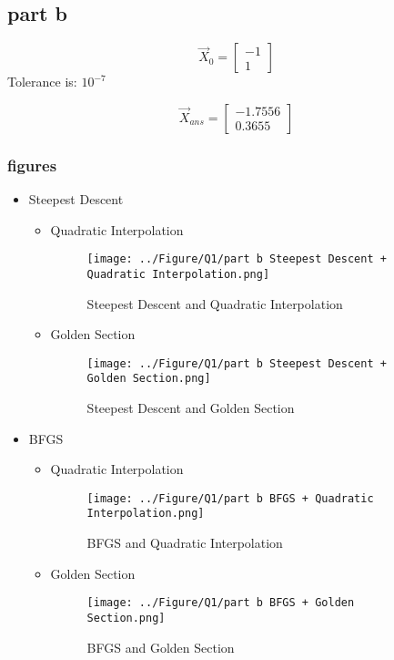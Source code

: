 \subsection{part b}
$$\vec X_0 = \begin{bmatrix}
	-1\\1
\end{bmatrix}$$
Tolerance is: $10^{-7}$


$$\vec X_{ans} = \begin{bmatrix}
	-1.7556\\
	0.3655
\end{bmatrix}$$
\subsubsection{figures}
\newpage
\begin{itemize}
	\item Steepest Descent
	\begin{itemize}
		\item Quadratic Interpolation
		\begin{figure}[H]
			\caption{Steepest Descent and Quadratic Interpolation}
			\centering
			\texttt{[image: ../Figure/Q1/part b Steepest Descent + Quadratic Interpolation.png]}
		\end{figure}
		\item Golden Section
		\begin{figure}[H]
			\caption{Steepest Descent and Golden Section}
			\centering
			\texttt{[image: ../Figure/Q1/part b Steepest Descent + Golden Section.png]}
		\end{figure}
	\end{itemize}
	\item BFGS
	\begin{itemize}
		\item Quadratic Interpolation
		\begin{figure}[H]
			\caption{BFGS and Quadratic Interpolation}
			\centering
			\texttt{[image: ../Figure/Q1/part b BFGS + Quadratic Interpolation.png]}
		\end{figure}
		\item Golden Section
		\begin{figure}[H]
			\caption{BFGS and Golden Section}
			\centering
			\texttt{[image: ../Figure/Q1/part b BFGS + Golden Section.png]}
		\end{figure}
	\end{itemize}
\end{itemize}

